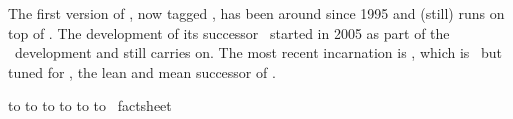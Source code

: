 \startbuffer[5]
    The first version of \CONTEXT, now tagged \MKII, has been around since 1995
    and (still) runs on top of \PDFTEX. The development of its successor \MKIV\
    started in 2005 as part of the \LUATEX\ development and still carries on. The
    most recent incarnation is \LMTX, which is \MKIV\ but tuned for \LUAMETATEX,
    the lean and mean successor of \LUATEX.
\stopbuffer


\startpagemakeup
    \offinterlineskip
    \vskip24pt
    \hbox to \hsize \bgroup
        \hss
        \startframed[align=normal,width=.7\textwidth,frame=off]
            \getbuffer[1]
        \stopframed
        \hskip1cm
    \egroup
    \vfill
    \hbox to \hsize \bgroup
        \hskip1cm
        \startframed[align=normal,width=.7\textwidth,frame=off]
            \getbuffer[2]
        \stopframed
    \egroup
    \vfill
    \hbox to \hsize \bgroup
        \hss
        \startframed[align=normal,width=.7\textwidth,frame=off]
            \getbuffer[3]
        \stopframed
        \hskip1cm
    \egroup
    \vfill
    \hbox to \hsize \bgroup
        \hss
        \setupitemize[after=]
        \startframed[align=normal,width=\dimexpr\textwidth-2cm\relax,frame=off]
            \getbuffer[4]
        \stopframed
        \hskip1cm
    \egroup
    \vfill
    \hbox to \hsize \bgroup
        \hss
        \startframed[align=normal,width=.7\textwidth,frame=off]
            \getbuffer[5]
        \stopframed
        \hskip1cm
    \egroup
    \vfill
    \vfill
    \vfill
    \hbox to \hsize \bgroup
        \hskip1cm
        \startframed[align=normal,width=.7\textwidth,frame=off]
            \bfd \CONTEXT\ \LMTX \enspace \emdash \enspace factsheet
        \stopframed
        \hss
    \egroup
    \vskip12pt
\stoppagemakeup

\stopdocument
